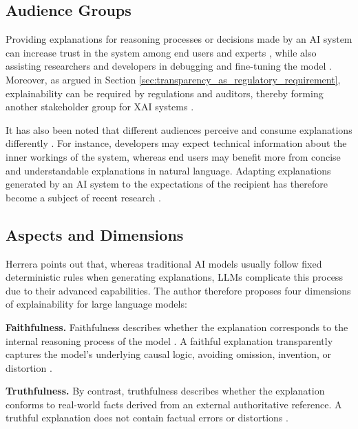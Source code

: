 \subsection{Audience Groups}
Providing explanations for reasoning processes or decisions made by an AI system can increase trust in the system among end users and experts \cite{viloneNotionsExplainabilityEvaluation2021, herreraMakingSenseUnsensible2025}, while also assisting researchers and developers in debugging and fine-tuning the model \cite{szymanskiDisentanglingStakeholderRole2025}. Moreover, as argued in Section \ref{sec:transparency_as_regulatory_requirement}, explainability can be required by regulations and auditors, thereby forming another stakeholder group for XAI systems \cite{herreraMakingSenseUnsensible2025, szymanskiDisentanglingStakeholderRole2025}.

It has also been noted that different audiences perceive and consume explanations differently \cite{herreraReflectionsAttentivenessEXplainable2025, herreraMakingSenseUnsensible2025}. For instance, developers may expect technical information about the inner workings of the system, whereas end users may benefit more from concise and understandable explanations in natural language. Adapting explanations generated by an AI system to the expectations of the recipient has therefore become a subject of recent research \cite{hoffmanExplainableAIRoles2023, mavrepisXAIAllCan2024}.

\subsection{Aspects and Dimensions}
\label{sec:aspects_and_dimensions}
Herrera \cite{herreraMakingSenseUnsensible2025} points out that, whereas traditional AI models usually follow fixed deterministic rules when generating explanations, LLMs complicate this process due to their advanced capabilities. The author therefore proposes four dimensions of explainability for large language models:

\noindent\textbf{Faithfulness.} Faithfulness describes whether the explanation corresponds to the internal reasoning process of the model \cite{jacoviFaithfullyInterpretableNLP2020, zhuExplanationEraLarge2024}. A faithful explanation transparently captures the model's underlying causal logic, avoiding omission, invention, or distortion \cite{herreraMakingSenseUnsensible2025}.

\noindent\textbf{Truthfulness.} By contrast, truthfulness describes whether the explanation conforms to real-world facts derived from an external authoritative reference. A truthful explanation does not contain factual errors or distortions \cite{herreraMakingSenseUnsensible2025}.

